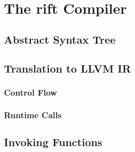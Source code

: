 \chapter{The rift Compiler}

\section{Abstract Syntax Tree}

\section{Translation to LLVM IR}
\subsection{Control Flow}
\subsection{Runtime Calls}

\section{Invoking Functions}
